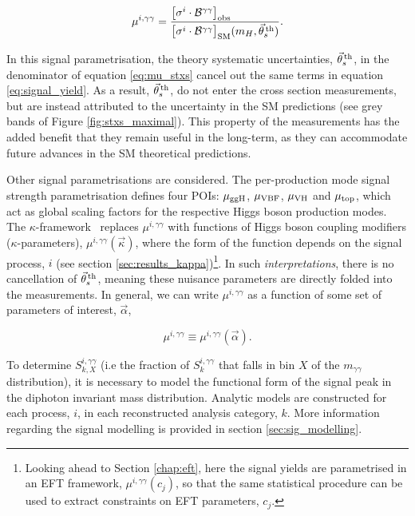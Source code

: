 \begin{equation}\label{eq:mu_stxs}
    \mu^{i,\gamma\gamma} = \frac{\big[\sigma^i \cdot \mathcal{B}^{\gamma\gamma} \big]_{\rm{obs}}\hfill}{\big[\sigma^i \cdot \mathcal{B}^{\gamma\gamma} \big]_{\rm{SM}}(m_H,\vec{\theta}^{\,\rm{th}}_{s})}.
\end{equation}

\noindent
In this signal parametrisation, the theory systematic uncertainties, $\vec{\theta}^{\,\rm{th}}_{s}$, in the denominator of equation \ref{eq:mu_stxs} cancel out the same terms in equation \ref{eq:signal_yield}. As a result, $\vec{\theta}^{\,\rm{th}}_{s}$, do not enter the cross section measurements, but are instead attributed to the uncertainty in the SM predictions (see grey bands of Figure \ref{fig:stxs_maximal}). This property of the measurements has the added benefit that they remain useful in the long-term, as they can accommodate future advances in the SM theoretical predictions.

Other signal parametrisations are considered. The per-production mode signal strength parametrisation defines four POIs: $\mu_{\rm{ggH}}$, $\mu_{\rm{VBF}}$, $\mu_{\rm{VH}}$ and $\mu_{\rm{top}}$, which act as global scaling factors for the respective Higgs boson production modes. The $\kappa$-framework~\cite{Heinemeyer:2013tqa} replaces $\mu^{i,\gamma\gamma}$ with functions of Higgs boson coupling modifiers ($\kappa$-parameters), $\mu^{i,\gamma\gamma}(\vec{\kappa})$, where the form of the function depends on the signal process, $i$ (see section \ref{sec:results_kappa})\footnote{Looking ahead to Section \ref{chap:eft}, here the signal yields are parametrised in an EFT framework, $\mu^{i,\gamma\gamma}(c_j)$, so that the same statistical procedure can be used to extract constraints on EFT parameters, $c_j$.}. In such \textit{interpretations}, there is no cancellation of $\vec{\theta}^{\,\rm{th}}_{s}$, meaning these nuisance parameters are directly folded into the measurements. In general, we can write $\mu^{i,\gamma\gamma}$ as a function of some set of parameters of interest, $\vec{\alpha}$,

\begin{equation}
    \mu^{i,\gamma\gamma} \equiv \mu^{i,\gamma\gamma}(\vec{\alpha}).
\end{equation}

To determine $S_{k,X}^{i,\gamma\gamma}$ (i.e the fraction of $S_k^{i,\gamma\gamma}$ that falls in bin $X$ of the $m_{\gamma\gamma}$ distribution), it is necessary to model the functional form of the signal peak in the diphoton invariant mass distribution. Analytic models are constructed for each process, $i$, in each reconstructed analysis category, $k$. More information regarding the signal modelling is provided in section \ref{sec:sig_modelling}.

